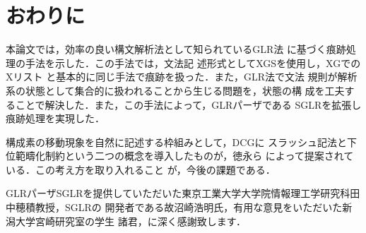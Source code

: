 \section{おわりに}

本論文では，効率の良い構文解析法として知られているGLR法
\cite{Tomita1987}に基づく痕跡処理の手法を示した．この手法では，文法記
述形式としてXGS\cite{Konno1986}を使用し，XGでのXリスト
\cite{Pereira1981}と基本的に同じ手法で痕跡を扱った．また，GLR法で文法
規則が解析系の状態として集合的に扱われることから生じる問題を，状態の構
成を工夫することで解決した．また，この手法によって，GLRパーザである
SGLR\cite{Numazaki1991}を拡張し痕跡処理を実現した．

構成素の移動現象を自然に記述する枠組みとして，DCG\cite{Pereira1980}に
スラッシュ記法と下位範疇化制約という二つの概念を導入したものが，徳永ら
によって提案されている\cite{Tokunaga1990}．この考え方を取り入れること
が，今後の課題である．\nocite{*}

\acknowledgment

GLRパーザSGLRを提供していただいた東京工業大学大学院情報理工学研究科田中穂積教授，SGLRの
開発者である故沼崎浩明氏，有用な意見をいただいた新潟大学宮崎研究室の学生
諸君，に深く感謝致します．





\begin{biography}


\end{biography}



